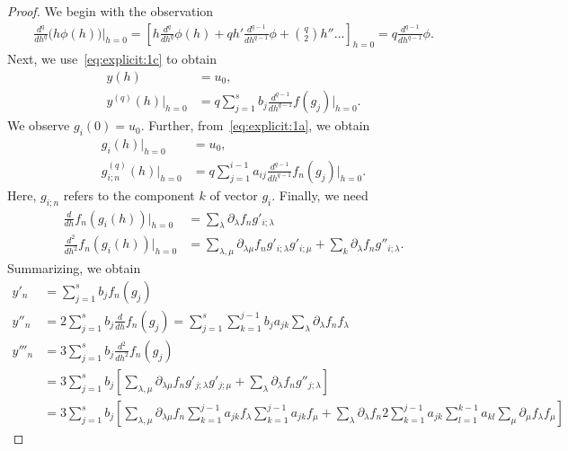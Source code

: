 \begin{proof}
  We begin with the observation
  \begin{gather*}
     \frac{d^{q}}{d h^{q}}\bigl(h\phi(h)\bigr)\bigg|_{h=0}
     = \left[ h \frac{d^{q}}{d h^{q}} \phi(h) + q h'
       \frac{d^{q-1}}{d h^{q-1}} \phi + \binom{q}{2}
       h''\dots\right]_{h=0}
     = q \frac{d^{q-1}}{d h^{q-1}} \phi.
  \end{gather*}
  Next, we use~\eqref{eq:explicit:1c} to obtain
  \begin{align*}
    y(h) &= u_0, \\
    y^{(q)}(h)\big|_{h=0} &= q \sum_{j=1}^s b_j \frac{d^{q-1}}{d h^{q-1}} f(g_j)\bigg|_{h=0}.
  \end{align*}
  We observe $g_i(0) = u_0$. Further, from~\eqref{eq:explicit:1a}, we
  obtain
  \begin{align*}
    g_i(h)\big|_{h=0} &= u_0, \\
    g_{i;n}^{(q)}(h)\big|_{h=0} &= q \sum_{j=1}^{i-1} a_{ij}
                                  \frac{d^{q-1}}{d h^{q-1}} f_n(g_{j})\bigg|_{h=0}.
  \end{align*}
  Here, $g_{i;n}$ refers to the component $k$ of vector
  $g_i$. Finally, we need
  \begin{align*}
    \frac{d}{d h} f_n(g_i(h))\big|_{h=0}
    & = \sum_{\lambda} \partial_{\lambda} f_n g'_{i;\lambda}\\
    \frac{d^2}{d h^2} f_n(g_i(h))\big|_{h=0}
    & = \sum_{\lambda,\mu} \partial_{\lambda\mu} f_n g'_{i;\lambda} g'_{i;\mu}
      + \sum_k \partial_{\lambda} f_n g''_{i;\lambda}.
  \end{align*}
  Summarizing, we obtain
  \begin{align*}
    y'_n &= \sum_{j=1}^s b_j f_n(g_j)
    \\
    y''_n &= 2 \sum_{j=1}^s b_j\frac{d}{d h} f_n(g_j)
    = \sum_{j=1}^s \sum_{k=1}^{j-1} b_j a_{j k}
            \sum_{\lambda} \partial_{\lambda} f_n f_\lambda
    \\
    y'''_n &= 3 \sum_{j=1}^s b_j\frac{d^2}{d h^2} f_n(g_j)
    \\&= 3 \sum_{j=1}^s b_j \left[
      \sum_{\lambda,\mu} \partial_{\lambda\mu} f_n g'_{j;\lambda} g'_{j;\mu}
      + \sum_\lambda \partial_{\lambda} f_n g''_{j;\lambda}\right]
    \\&= 3 \sum_{j=1}^s b_j \left[
        \sum_{\lambda,\mu} \partial_{\lambda\mu} f_n \sum_{k=1}^{j-1} a_{j k}
        f_\lambda \sum_{k=1}^{j-1} a_{j k}
        f_\mu + \sum_{\lambda} \partial_{\lambda} f_n 2 \sum_{k=1}^{j-1}
        a_{j k} \sum_{l=1}^{k-1} a_{kl} \sum_\mu \partial_\mu f_\lambda f_\mu
        \right]
  \end{align*}
\end{proof}


